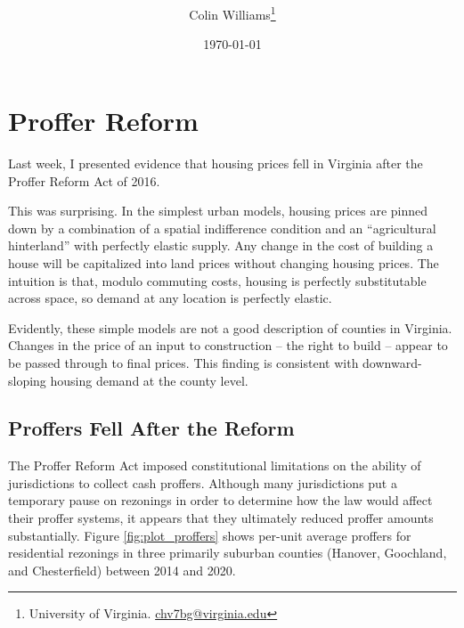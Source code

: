\documentclass[12pt]{article}
\title{ \vspace*{-2.5cm} \hspace*{-0.5cm} }
\author{Colin Williams\thanks{University of Virginia.
\href{mailto:chv7bg@virginia.edu}{chv7bg@virginia.edu}}}
\date{ \vspace*{0.5cm} \today} %
\begin{document}
\bgroup
\let\footnoterule\relax

\maketitle

\begin{abstract}
\noindent 
\end{abstract}


\noindent 

\section{Proffer Reform}  \label{sec:data}

Last week, I presented evidence that housing prices fell in Virginia after the Proffer Reform Act of 2016. 

This was surprising. In the simplest urban models, housing prices are pinned down by a combination of a spatial indifference condition and an ``agricultural hinterland'' with perfectly elastic supply. Any change in the cost of building a house will be capitalized into land prices without changing housing prices. The intuition is that, modulo commuting costs, housing is perfectly substitutable across space, so demand at any location is perfectly elastic.

Evidently, these simple models are not a good description of counties in Virginia. Changes in the price of an input to construction -- the right to build -- appear to be passed through to final prices. This finding is consistent with downward-sloping housing demand at the county level.

\subsection{Proffers Fell After the Reform}

The Proffer Reform Act imposed constitutional limitations on the ability of jurisdictions to collect cash proffers. Although many jurisdictions put a temporary pause on rezonings in order to determine how the law would affect their proffer systems, it appears that they ultimately reduced proffer amounts substantially. Figure \ref{fig:plot_proffers} shows per-unit average proffers for residential rezonings in three primarily suburban counties (Hanover, Goochland, and Chesterfield) between 2014 and 2020.
\end{document}
